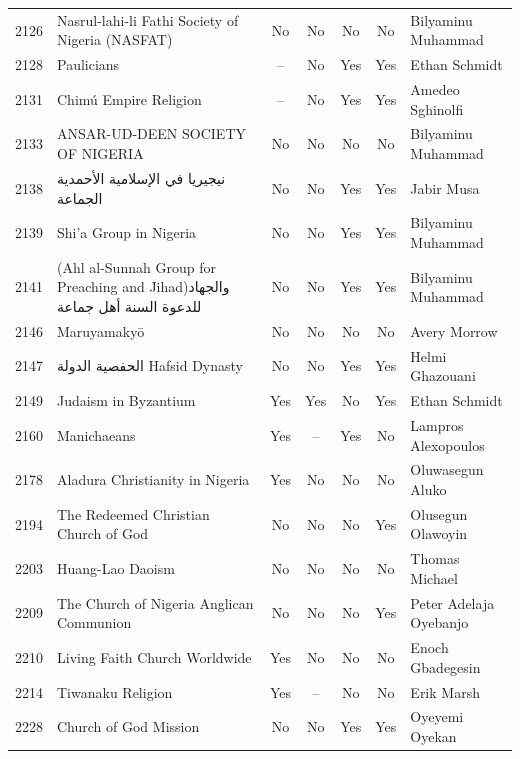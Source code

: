 {\begin{longtable}{rp{3.5cm}ccccp{3cm}}
2126 & {\raggedright Nasrul-lahi-li Fathi Society of Nigeria (NASFAT)} & No & No & No & No & {\raggedright Bilyaminu Muhammad} \\
2128 & {\raggedright Paulicians} & -- & No & Yes & Yes & {\raggedright Ethan Schmidt} \\
2131 & {\raggedright Chimú Empire Religion} & -- & No & Yes & Yes & {\raggedright Amedeo Sghinolfi} \\
2133 & {\raggedright ANSAR-UD-DEEN SOCIETY OF NIGERIA} & No & No & No & No & {\raggedright Bilyaminu Muhammad} \\
2138 & {\raggedright {\arabicfont نيجيريا في الإسلامية الأحمدية الجماعة}} & No & No & Yes & Yes & {\raggedright Jabir  Musa} \\
2139 & {\raggedright Shi'a Group in Nigeria} & No & No & Yes & Yes & {\raggedright Bilyaminu Muhammad} \\
2141 & {\raggedright (Ahl al-Sunnah Group for Preaching and Jihad){\arabicfont والجهاد للدعوة السنة أهل جماعة}} & No & No & Yes & Yes & {\raggedright Bilyaminu Muhammad} \\
2146 & {\raggedright Maruyamakyō} & No & No & No & No & {\raggedright Avery Morrow} \\
2147 & {\raggedright {\arabicfont الحفصية الدولة} Hafsid Dynasty} & No & No & Yes & Yes & {\raggedright Helmi Ghazouani} \\
2149 & {\raggedright Judaism in Byzantium} & Yes & Yes & No & Yes & {\raggedright Ethan Schmidt} \\
2160 & {\raggedright Manichaeans} & Yes & -- & Yes & No & {\raggedright Lampros Alexopoulos} \\
2178 & {\raggedright Aladura Christianity in Nigeria} & Yes & No & No & No & {\raggedright Oluwasegun Aluko} \\
2194 & {\raggedright The Redeemed Christian Church of God} & No & No & No & Yes & {\raggedright Olusegun Olawoyin} \\
2203 & {\raggedright Huang-Lao Daoism} & No & No & No & No & {\raggedright Thomas Michael} \\
2209 & {\raggedright The Church of Nigeria Anglican Communion} & No & No & No & Yes & {\raggedright Peter Adelaja Oyebanjo} \\
2210 & {\raggedright Living Faith Church Worldwide} & Yes & No & No & No & {\raggedright Enoch Gbadegesin} \\
2214 & {\raggedright Tiwanaku Religion} & Yes & -- & No & No & {\raggedright Erik Marsh} \\
2228 & {\raggedright Church of God Mission} & No & No & Yes & Yes & {\raggedright Oyeyemi Oyekan} \\

\end{longtable}}
